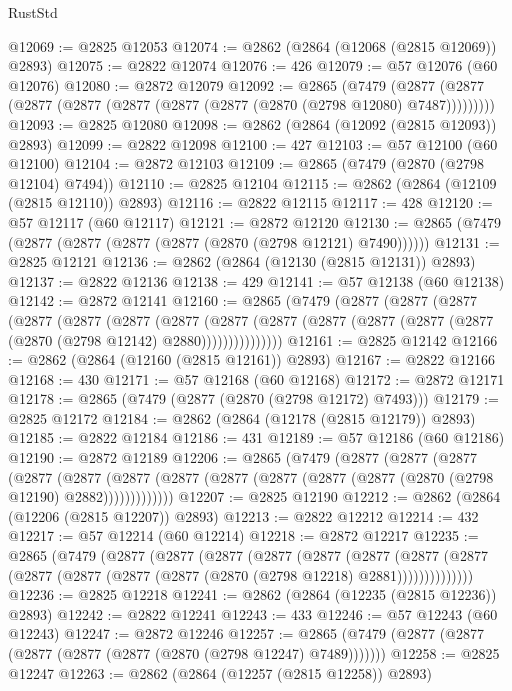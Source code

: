 \begin{lexlean}{RustStd}
\begin{coremodule}
@12069 := @2825 @12053
@12074 := @2862 (@2864 (@12068 (@2815 @12069)) @2893)
@12075 := @2822 @12074
@12076 := 426
@12079 := @57 @12076 (@60 @12076)
@12080 := @2872 @12079
@12092 := @2865
    (@7479 (@2877 (@2877 (@2877 (@2877 (@2877 (@2877 (@2877 (@2870 (@2798 @12080) @7487)))))))))
@12093 := @2825 @12080
@12098 := @2862 (@2864 (@12092 (@2815 @12093)) @2893)
@12099 := @2822 @12098
@12100 := 427
@12103 := @57 @12100 (@60 @12100)
@12104 := @2872 @12103
@12109 := @2865 (@7479 (@2870 (@2798 @12104) @7494))
@12110 := @2825 @12104
@12115 := @2862 (@2864 (@12109 (@2815 @12110)) @2893)
@12116 := @2822 @12115
@12117 := 428
@12120 := @57 @12117 (@60 @12117)
@12121 := @2872 @12120
@12130 := @2865 (@7479 (@2877 (@2877 (@2877 (@2877 (@2870 (@2798 @12121) @7490))))))
@12131 := @2825 @12121
@12136 := @2862 (@2864 (@12130 (@2815 @12131)) @2893)
@12137 := @2822 @12136
@12138 := 429
@12141 := @57 @12138 (@60 @12138)
@12142 := @2872 @12141
@12160 := @2865
    (@7479
      (@2877
        (@2877
          (@2877
            (@2877
              (@2877
                (@2877
                  (@2877
                    (@2877
                      (@2877 (@2877 (@2877 (@2877 (@2877 (@2870 (@2798 @12142) @2880)))))))))))))))
@12161 := @2825 @12142
@12166 := @2862 (@2864 (@12160 (@2815 @12161)) @2893)
@12167 := @2822 @12166
@12168 := 430
@12171 := @57 @12168 (@60 @12168)
@12172 := @2872 @12171
@12178 := @2865 (@7479 (@2877 (@2870 (@2798 @12172) @7493)))
@12179 := @2825 @12172
@12184 := @2862 (@2864 (@12178 (@2815 @12179)) @2893)
@12185 := @2822 @12184
@12186 := 431
@12189 := @57 @12186 (@60 @12186)
@12190 := @2872 @12189
@12206 := @2865
    (@7479
      (@2877
        (@2877
          (@2877
            (@2877
              (@2877
                (@2877 (@2877 (@2877 (@2877 (@2877 (@2877 (@2870 (@2798 @12190) @2882)))))))))))))
@12207 := @2825 @12190
@12212 := @2862 (@2864 (@12206 (@2815 @12207)) @2893)
@12213 := @2822 @12212
@12214 := 432
@12217 := @57 @12214 (@60 @12214)
@12218 := @2872 @12217
@12235 := @2865
    (@7479
      (@2877
        (@2877
          (@2877
            (@2877
              (@2877
                (@2877
                  (@2877
                    (@2877 (@2877 (@2877 (@2877 (@2877 (@2870 (@2798 @12218) @2881))))))))))))))
@12236 := @2825 @12218
@12241 := @2862 (@2864 (@12235 (@2815 @12236)) @2893)
@12242 := @2822 @12241
@12243 := 433
@12246 := @57 @12243 (@60 @12243)
@12247 := @2872 @12246
@12257 := @2865 (@7479 (@2877 (@2877 (@2877 (@2877 (@2877 (@2870 (@2798 @12247) @7489)))))))
@12258 := @2825 @12247
@12263 := @2862 (@2864 (@12257 (@2815 @12258)) @2893)

\end{coremodule}
\end{lexlean}
